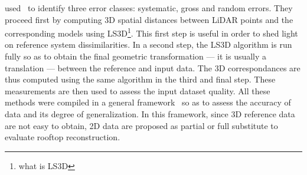 \documentclass[../main.tex]{subfiles}
\begin{document}
used~\cite{Akca2010} to identify three error classes: systematic, gross and random errors. They proceed first by computing 3D spatial distances between LiDAR points and the corresponding models using LS3D\footnote{what is LS3D}. This first step is useful in order to shed light on reference system dissimilarities. In a second step, the LS3D algorithm is run fully so as to obtain the final geometric transformation --- it is usually a translation --- between the reference and input data. The 3D correspondances are thus computed using the same algorithm in the third and final step. These measurements are then used to assess the input dataset quality. All these methods were compiled in a general framework~\cite{Schuster2003} so as to assess the accuracy of data and its degree of generalization. In this framework, since 3D reference data are not easy to obtain, 2D data are proposed as partial or full substitute to evaluate rooftop reconstruction. \\
\end{document}
